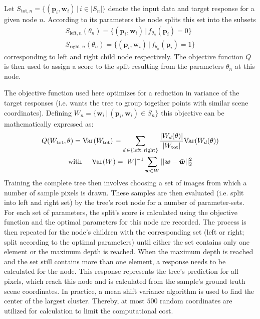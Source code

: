\documentclass[final]{cvpr}
\begin{document}
Let $S_{\text{tot},n} = \{ (\boldsymbol{p}_i, \boldsymbol{w}_i) \, | \, i \in |S_n|\}$ denote the
input data and target response for a given node $n$. According to its parameters the
node splits this set into the subsets
\begin{equation}
\begin{split}
	S_{\text{left},n}(\theta_n) = \{(\boldsymbol{p}_i, \boldsymbol{w}_i) \,|\, f_{\theta_n}(\boldsymbol{p}_i) = 0\} \\
	S_{\text{right},n}(\theta_n) = \{(\boldsymbol{p}_i, \boldsymbol{w}_i) \,|\, f_{\theta_n}(\boldsymbol{p}_i) = 1\}
\end{split}
\end{equation}
corresponding to left and right child node respectively. The objective function $Q$ is
then used to assign a score to the split resulting from the parameters $\theta_n$ at
this node.

The objective function used here optimizes for a reduction in variance of the target 
responses (i.e. wants the tree to group together points with similar scene coordinates).
Defining $W_n = \{ \boldsymbol{w}_i \, | \, (\boldsymbol{p}_i, \boldsymbol{w}_i) \in S_n \}$ this
objective can be mathematically expressed as:
\begin{multline}
	Q(W_\text{tot}, \theta) =
		\text{Var}(W_\text{tot})\, - \sum_{d\,\in\{\text{left,\,right}\}}
			\dfrac{|W_d(\theta)|}{|W_\text{tot}|} \text{Var}(W_d(\theta))\\
	\text{with} \hspace{5mm} \text{Var}(W) = |W|^{-1} \sum_{\boldsymbol{w}\in W} ||\boldsymbol{w} - \bar{\boldsymbol{w}}||_2^2
\end{multline}
Training the complete tree then involves choosing a set of images from which a number
of sample pixels is drawn. These samples are then evaluated (i.e. split into left and right set)
by the tree's root node for a number of parameter-sets. For each set of parameters, the
split's score is calculated using the objective function and the optimal parameters for
this node are recorded. The process is then repeated for the node's children with the corresponding
set (left or right; split according to the optimal parameters) until either the set contains
only one element or the maximum depth is reached.
When the maximum depth is reached and the set still contains more than one element, a response
needs to be calculated for the node. This response represents the tree's prediction for 
all pixels, which reach this node and is calculated from the sample's ground truth scene coordinates.
In practice, a mean shift variance algorithm \cite{Comaniciu2002} is used to find the center of the 
largest cluster. Thereby, at most $500$ random coordinates are utilized for calculation to limit 
the computational cost.
\end{document}
